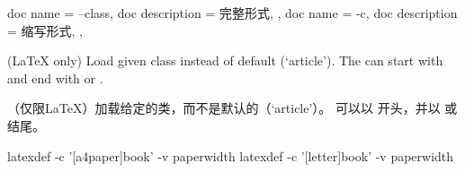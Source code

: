 \begin{docKeys}[
    doc no index,   %
    doc parameter = {~\meta{class}},
    ]
    {
    {
        doc name        = --class,
        doc description = 完整形式,
    },
    {
        doc name        = -c,
        doc description = 缩写形式,
    },
    }
    
    (LaTeX only) Load given class instead of default (`article').
The  can start with  and end
with  or .
  
（仅限LaTeX）加载给定的类，而不是默认的（`article'）。 可以以  开头，并以 或  结尾。
    
    
\begin{commandshell} 
latexdef -c '[a4paper]{book}' -v paperwidth
latexdef -c '[letter]{book}'  -v paperwidth
\end{commandshell}  
\end{docKeys}
    
    